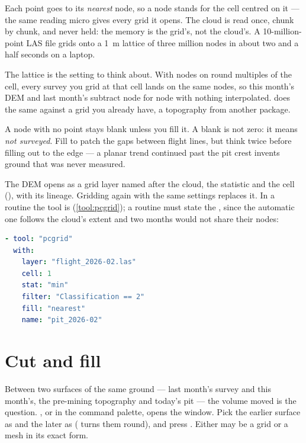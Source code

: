 Each point goes to its \emph{nearest} node, so a node stands for the cell centred on it — the same reading micro gives every grid it opens. The cloud is read once, chunk by chunk, and never held: the memory is the grid's, not the cloud's. A 10-million-point LAS file grids onto a 1~m lattice of three million nodes in about two and a half seconds on a laptop.

The lattice is the setting to think about. With nodes on round multiples of the cell, every survey you grid at that cell lands on the same nodes, so this month's DEM and last month's subtract node for node with nothing interpolated.  does the same against a grid you already have, a topography from another package.

\begin{caution}
A node with no point stays blank unless you fill it. A blank is not zero: it means \emph{not surveyed}. Fill  to patch the gaps between flight lines, but think twice before filling out to the edge — a planar trend continued past the pit crest invents ground that was never measured.
\end{caution}

The DEM opens as a grid layer named after the cloud, the statistic and the cell (), with its lineage. Gridding again with the same settings replaces it. In a routine the tool is  (\cref{tool:pcgrid}); a routine must state the , since the automatic one follows the cloud's extent and two months would not share their nodes:

\begin{lstlisting}[language=yaml]
- tool: "pcgrid"
  with:
    layer: "flight_2026-02.las"
    cell: 1
    stat: "min"
    filter: "Classification == 2"
    fill: "nearest"
    name: "pit_2026-02"
\end{lstlisting}

\section{Cut and fill}\label{sec:grids-cutfill}
Between two surfaces of the same ground — last month's survey and this month's, the pre-mining topography and today's pit — the volume moved is the question. , or  in the command palette, opens the  window. Pick the earlier surface as  and the later as  ( turns them round), and press . Either may be a grid or a mesh in its exact form.


